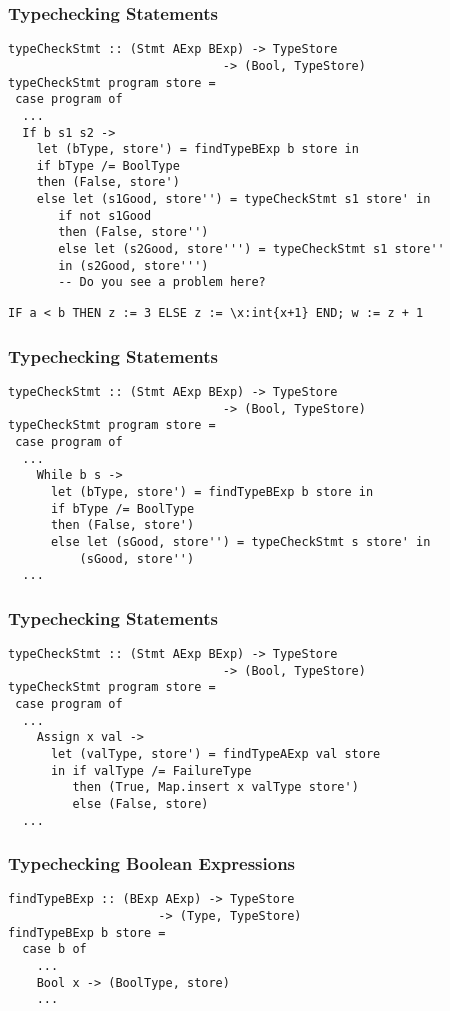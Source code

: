 \documentclass{beamer}
\begin{document}
\begin{frame}[fragile]
\frametitle{Typechecking Statements}
\begin{verbatim}
typeCheckStmt :: (Stmt AExp BExp) -> TypeStore 
                              -> (Bool, TypeStore)
typeCheckStmt program store =
 case program of
  ...    
  If b s1 s2 ->
    let (bType, store') = findTypeBExp b store in
    if bType /= BoolType
    then (False, store')
    else let (s1Good, store'') = typeCheckStmt s1 store' in
       if not s1Good
       then (False, store'')
       else let (s2Good, store''') = typeCheckStmt s1 store''
       in (s2Good, store''')
       -- Do you see a problem here?
\end{verbatim}
\pause
\begin{verbatim}
IF a < b THEN z := 3 ELSE z := \x:int{x+1} END; w := z + 1
\end{verbatim}
\end{frame}
\begin{frame}[fragile]
\frametitle{Typechecking Statements}
\begin{verbatim}
typeCheckStmt :: (Stmt AExp BExp) -> TypeStore 
                              -> (Bool, TypeStore)
typeCheckStmt program store =
 case program of
  ...
    While b s ->
      let (bType, store') = findTypeBExp b store in 
      if bType /= BoolType
      then (False, store')
      else let (sGood, store'') = typeCheckStmt s store' in
          (sGood, store'')   
  ...
\end{verbatim}
\end{frame}

\begin{frame}[fragile]
\frametitle{Typechecking Statements}
\begin{verbatim}
typeCheckStmt :: (Stmt AExp BExp) -> TypeStore 
                              -> (Bool, TypeStore)
typeCheckStmt program store =
 case program of
  ...
    Assign x val ->
      let (valType, store') = findTypeAExp val store
      in if valType /= FailureType
         then (True, Map.insert x valType store')
         else (False, store)
  ...
\end{verbatim}
\end{frame}

\begin{frame}[fragile]
\frametitle{Typechecking Boolean Expressions}
\begin{verbatim}
findTypeBExp :: (BExp AExp) -> TypeStore 
                     -> (Type, TypeStore)
findTypeBExp b store =
  case b of
    ...
    Bool x -> (BoolType, store)
    ...
\end{verbatim}
\end{frame}
\end{document}
